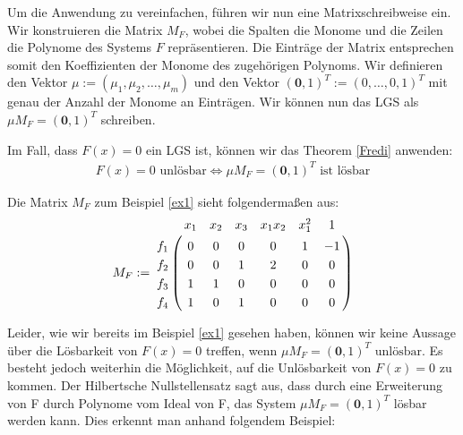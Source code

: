 \noindent Um die Anwendung zu vereinfachen, führen wir nun eine Matrixschreibweise ein. Wir konstruieren die Matrix $M_F$, wobei die Spalten die Monome und die Zeilen die Polynome des Systems $F$ repräsentieren. Die Einträge der Matrix entsprechen somit den Koeffizienten der Monome des zugehörigen Polynoms.  Wir definieren den Vektor $\mu := (\mu_1,\mu_2,\ldots,\mu_m)$ und den Vektor $(\textbf{0},1)^T:=(0,\ldots,0,1)^T$ mit genau der Anzahl der Monome an Einträgen. Wir können nun das LGS als $\mu M_F = (\textbf{0},1)^T$ schreiben. 
\begin{note}
Im Fall, dass $F(x)=0$ ein LGS ist, können wir das Theorem \ref{Fredi} anwenden: 
\begin{align*}
F(x)=0 \text{ unlösbar} \Leftrightarrow \mu M_F = (\textbf{0},1)^T \text{ ist lösbar}
\end{align*}
\end{note}  

\begin{example}
Die Matrix $M_F$ zum Beispiel \ref{ex1} sieht folgendermaßen aus: 
\begin{align*}
M_F := \bordermatrix{
	& x_{1} & x_2 & x_3 & x_1x_2 & x_1^2 & 1 \cr
	f_1 & 0 & 0 & 0 & 0 & 1 & -1 \cr
	f_2 & 0 & 0 & 1 & 2 & 0 & 0 \cr
	f_3 & 1 & 1 & 0 & 0 & 0 & 0 \cr
	f_4 & 1 & 0 & 1 & 0 & 0 & 0
}
\end{align*}
\end{example}


\noindent Leider, wie wir bereits im Beispiel \ref{ex1} gesehen haben, können wir keine Aussage über die Lösbarkeit von $F(x) = 0$ treffen, wenn
$\mu M_F = (\textbf{0},1)^T \text{ unlösbar}$. Es besteht jedoch weiterhin die Möglichkeit, auf die Unlösbarkeit von $F(x) = 0$ zu kommen. Der Hilbertsche Nullstellensatz sagt aus, dass durch eine Erweiterung von F durch Polynome vom Ideal von F, das System $\mu M_F = (\textbf{0},1)^T$ lösbar werden kann. Dies erkennt man anhand folgendem Beispiel:

